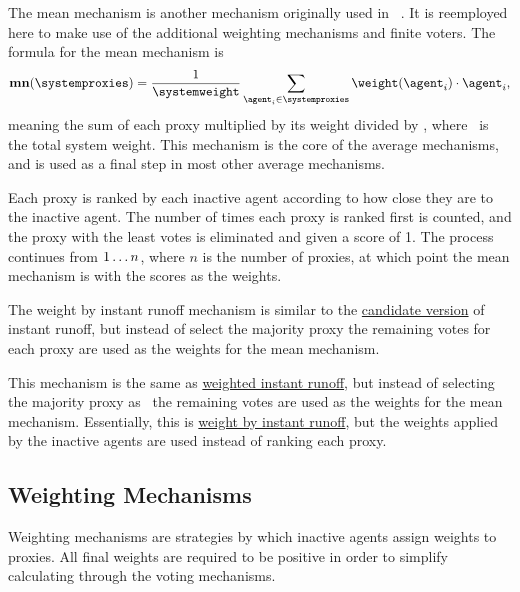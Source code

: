 The mean mechanism is another mechanism originally used in
~\cite{Cohensius2017}.
It is reemployed here to make use of the additional weighting mechanisms and
finite voters.
The formula for the mean mechanism is
\begin{equation*}
    \mathbf{mn}(\systemproxies) =
    \frac{1}{\systemweight}
    \sum_{\agent_i \in \systemproxies} {\weightof{\agent_i} \cdot \agent_i}
    \text{,}\label{eq:mean-mechanism}
\end{equation*}
meaning the sum of each proxy multiplied by its weight divided by
\systemweight, where \systemweight\ is the total system weight.
This mechanism is the core of the average mechanisms, and is used as a final
step in most other average mechanisms.

Each proxy is ranked by each inactive agent according to how close they are
to the inactive agent.
The number of times each proxy is ranked first is counted, and the proxy with
the least votes is eliminated and given a score of 1.
The process continues from $1 \mathellipsis n$, where $n$ is the number of
proxies, at which point the mean mechanism is with the scores as the weights.

\label{para:avg-instant-runoff}
The weight by instant runoff mechanism is similar to the
\hyperref[para:candidate-instant-runoff]{candidate version} of instant
runoff, but instead of select the majority proxy the remaining votes for
each proxy are used as the weights for the mean mechanism.

This mechanism is the same as
\hyperref[para:candidate-weighted-instant-runoff]{weighted instant runoff},
but instead of selecting the majority proxy as \systemtruth\ the remaining votes
are used as the weights for the mean mechanism.
Essentially, this is
\hyperref[para:avg-instant-runoff]{weight by instant runoff}, but the weights
applied by the inactive agents are used instead of ranking each proxy.

\subsection{Weighting Mechanisms}\label{subsec:weighting-mechanisms}
Weighting mechanisms are strategies by which inactive agents assign weights
to proxies.
All final weights are required to be positive in order to simplify
calculating \systemtruth through the voting mechanisms.

